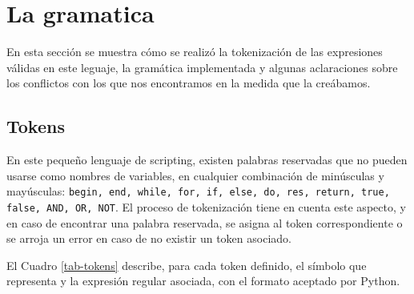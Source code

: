 \section{La gramatica}

En esta sección se muestra cómo se realizó la tokenización de las expresiones válidas en este leguaje, la gramática implementada y algunas aclaraciones sobre los conflictos con los que nos encontramos en la medida que la creábamos.

\subsection{Tokens}

En este pequeño lenguaje de scripting, existen palabras reservadas que no pueden usarse como nombres de variables, en cualquier combinación de minúsculas y mayúsculas: {\tt begin, end, while, for,
if, else, do, res, return, true, false, AND, OR, NOT}. El proceso de tokenización tiene en cuenta este aspecto, y en caso de encontrar una palabra reservada, se asigna al token correspondiente o se arroja un error en caso de no existir un token asociado.

El Cuadro \ref{tab-tokens} describe, para cada token definido, el símbolo que representa y la expresión regular asociada, con el formato aceptado por Python.

